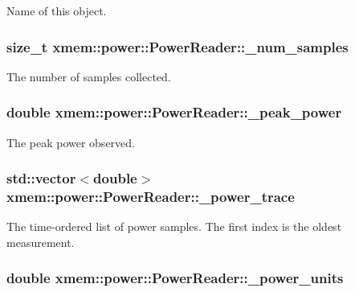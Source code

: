 Name of this object. \hypertarget{classxmem_1_1power_1_1_power_reader_a296a8d15083e01e33590cbcd836aa07b}{
\subsubsection[{\-\_\-num\-\_\-samples}]{\setlength{\rightskip}{0pt plus 5cm}size\-\_\-t xmem\-::power\-::\-Power\-Reader\-::\-\_\-num\-\_\-samples\hspace{0.3cm}{\ttfamily [protected]}}}\label{classxmem_1_1power_1_1_power_reader_a296a8d15083e01e33590cbcd836aa07b}
The number of samples collected. \hypertarget{classxmem_1_1power_1_1_power_reader_a0bfe4f56c143f3febb404d85558e45fa}{
\subsubsection[{\-\_\-peak\-\_\-power}]{\setlength{\rightskip}{0pt plus 5cm}double xmem\-::power\-::\-Power\-Reader\-::\-\_\-peak\-\_\-power\hspace{0.3cm}{\ttfamily [protected]}}}\label{classxmem_1_1power_1_1_power_reader_a0bfe4f56c143f3febb404d85558e45fa}
The peak power observed. \hypertarget{classxmem_1_1power_1_1_power_reader_ac8ad4bada42912ece1cbb0769dbe3b4d}{
\subsubsection[{\-\_\-power\-\_\-trace}]{\setlength{\rightskip}{0pt plus 5cm}std\-::vector$<$double$>$ xmem\-::power\-::\-Power\-Reader\-::\-\_\-power\-\_\-trace\hspace{0.3cm}{\ttfamily [protected]}}}\label{classxmem_1_1power_1_1_power_reader_ac8ad4bada42912ece1cbb0769dbe3b4d}
The time-\/ordered list of power samples. The first index is the oldest measurement. \hypertarget{classxmem_1_1power_1_1_power_reader_a2835c933bd4807d6b3133a521dd76641}{
\subsubsection[{\-\_\-power\-\_\-units}]{\setlength{\rightskip}{0pt plus 5cm}double xmem\-::power\-::\-Power\-Reader\-::\-\_\-power\-\_\-units\hspace{0.3cm}{\ttfamily [protected]}}}\label{classxmem_1_1power_1_1_power_reader_a2835c933bd4807d6b3133a521dd76641}

